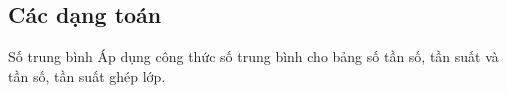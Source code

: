 \subsection{Các dạng toán}
\begin{dang}{Số trung bình}
Áp dụng công thức số trung bình cho bảng số tần số, tần suất và tần số, tần suất ghép lớp.
% 
% 
% 
% 
% 
% 
% 
% 
\end{dang}
